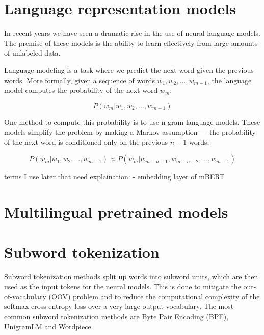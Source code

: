 \section{Language representation models}

In recent years we have seen a dramatic rise in the use of neural language models. The premise of these models is the ability to learn effectively from large amounts of unlabeled data. 


Language modeling is a task where we predict the next word given the previous words. \cite{manning_foundations_1999} More formally, given a sequence of words $w_1, w_2, \dots, w_{m-1}$, the language model computes the probability of the next word $w_{m}$:

\begin{equation}
    P(w_{m} | w_1, w_2, \dots, w_{m-1})
\end{equation}

One method to compute this probability is to use n-gram language models. These models simplify the problem by making a Markov assumption --- the probability of the next word is conditioned only on the previous $n-1$ words:

\begin{equation}
    P(w_{m} | w_1, w_2, \dots, w_{m-1}) \approx P(w_{m} | w_{m-n+1}, w_{m-n+2}, \dots, w_{m-1})
\end{equation}


terms I use later that need explaination:
- embedding layer of mBERT

\section{Multilingual pretrained models}


\section{Subword tokenization}

Subword tokenization methods split up words into subword units, which are then used as the input tokens for the neural models. This is done to mitigate the out-of-vocabulary (OOV) problem and to reduce the computational complexity of the softmax cross-entropy loss over a very large output vocabulary. The most common subword tokenization methods are Byte Pair Encoding (BPE), UnigramLM and Wordpiece.

